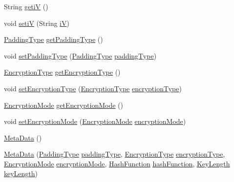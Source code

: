 \begin{DoxyCompactItemize}
\item 
String \mbox{\hyperlink{classpersistence_1_1_meta_data_adcde7cd511ae0ee0c28c6127cb92a368}{getiV}} ()
\item 
void \mbox{\hyperlink{classpersistence_1_1_meta_data_a5939dac29afb5346f5753b349f3d43eb}{setiV}} (String \mbox{\hyperlink{classpersistence_1_1_meta_data_a5c426ff8fb562b6e8e045fe0da09d315}{iV}})
\item 
\mbox{\hyperlink{enumenums_1_1_padding_type}{Padding\+Type}} \mbox{\hyperlink{classpersistence_1_1_meta_data_a061742e63ca7dce02b2a0146b760721e}{get\+Padding\+Type}} ()
\item 
void \mbox{\hyperlink{classpersistence_1_1_meta_data_a296b3684b18af3ab1a8b7e628a686d3d}{set\+Padding\+Type}} (\mbox{\hyperlink{enumenums_1_1_padding_type}{Padding\+Type}} \mbox{\hyperlink{classpersistence_1_1_meta_data_a68266f3ba604835eb47717b246197a3a}{padding\+Type}})
\item 
\mbox{\hyperlink{enumenums_1_1_encryption_type}{Encryption\+Type}} \mbox{\hyperlink{classpersistence_1_1_meta_data_af99778b26e5d774a56299ec127b9bfa9}{get\+Encryption\+Type}} ()
\item 
void \mbox{\hyperlink{classpersistence_1_1_meta_data_a7406483df8ef635af814afc53a6dcca6}{set\+Encryption\+Type}} (\mbox{\hyperlink{enumenums_1_1_encryption_type}{Encryption\+Type}} \mbox{\hyperlink{classpersistence_1_1_meta_data_a09c1b0443d6c5ee3fe58b77fbaf3f1f8}{encryption\+Type}})
\item 
\mbox{\hyperlink{enumenums_1_1_encryption_mode}{Encryption\+Mode}} \mbox{\hyperlink{classpersistence_1_1_meta_data_a3b89a90760bf48f005a18ff0c2b5323c}{get\+Encryption\+Mode}} ()
\item 
void \mbox{\hyperlink{classpersistence_1_1_meta_data_aff1f46dfd2331d522c642ca534af7fe1}{set\+Encryption\+Mode}} (\mbox{\hyperlink{enumenums_1_1_encryption_mode}{Encryption\+Mode}} \mbox{\hyperlink{classpersistence_1_1_meta_data_a9f43ee5f622a5634c751d027ab64287e}{encryption\+Mode}})
\item 
\mbox{\hyperlink{classpersistence_1_1_meta_data_a9a1db720156f7a2bf7a556c4c95d2619}{Meta\+Data}} ()
\item 
\mbox{\hyperlink{classpersistence_1_1_meta_data_aacd9766a809a88084b8a2be9470fd31a}{Meta\+Data}} (\mbox{\hyperlink{enumenums_1_1_padding_type}{Padding\+Type}} \mbox{\hyperlink{classpersistence_1_1_meta_data_a68266f3ba604835eb47717b246197a3a}{padding\+Type}}, \mbox{\hyperlink{enumenums_1_1_encryption_type}{Encryption\+Type}} \mbox{\hyperlink{classpersistence_1_1_meta_data_a09c1b0443d6c5ee3fe58b77fbaf3f1f8}{encryption\+Type}}, \mbox{\hyperlink{enumenums_1_1_encryption_mode}{Encryption\+Mode}} \mbox{\hyperlink{classpersistence_1_1_meta_data_a9f43ee5f622a5634c751d027ab64287e}{encryption\+Mode}}, \mbox{\hyperlink{enumenums_1_1_hash_function}{Hash\+Function}} \mbox{\hyperlink{classpersistence_1_1_meta_data_abefaf99931c3284bf4d069ff253ec714}{hash\+Function}}, \mbox{\hyperlink{enumenums_1_1_key_length}{Key\+Length}} \mbox{\hyperlink{classpersistence_1_1_meta_data_ae6b0f8f276c22bca3d79628131e2b274}{key\+Length}})
\end{DoxyCompactItemize}

